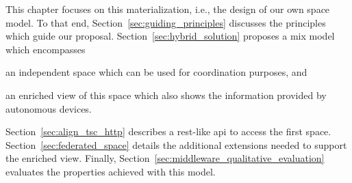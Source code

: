 This chapter focuses on this materialization, i.e., the design of our own space model.
To that end, Section~\ref{sec:guiding_principles} discusses the principles which guide our proposal.
Section~\ref{sec:hybrid_solution} proposes a mix model which encompasses
\begin{enumerate*}[label=\itshape(\alph*\upshape)]
  \item an independent space which can be used for coordination purposes, and
  \item an enriched view of this space which also shows the information provided by autonomous devices.
\end{enumerate*}
Section~\ref{sec:align_tsc_http} describes a \ac{rest}-like \ac{api} to access the first space.
Section~\ref{sec:federated_space} details the additional extensions needed to support the enriched view.
Finally, Section~\ref{sec:middleware_qualitative_evaluation} evaluates the properties achieved with this model.






